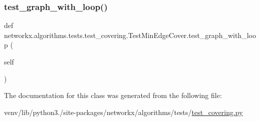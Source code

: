 \subsubsection{\texorpdfstring{test\+\_\+graph\+\_\+with\+\_\+loop()}{test\_graph\_with\_loop()}}
{\footnotesize\ttfamily def networkx.\+algorithms.\+tests.\+test\+\_\+covering.\+Test\+Min\+Edge\+Cover.\+test\+\_\+graph\+\_\+with\+\_\+loop (\begin{DoxyParamCaption}\item[{}]{self }\end{DoxyParamCaption})}



The documentation for this class was generated from the following file\+:\begin{DoxyCompactItemize}
\item 
venv/lib/python3./site-\/packages/networkx/algorithms/tests/\hyperlink{tests_2test__covering_8py}{test\+\_\+covering.\+py}\end{DoxyCompactItemize}
